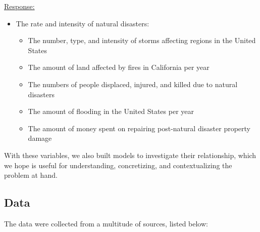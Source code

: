 \documentclass[10pt,]{article}
\begin{document}
\underline{Response:}

\begin{itemize}
  \item The rate and intensity of natural disasters:
  \begin{itemize}
    \item The number, type, and intensity of storms affecting regions in the United States
    \item The amount of land affected by fires in California per year
    \item The numbers of people displaced, injured, and killed due to natural disasters
    \item The amount of flooding in the United States per year
    \item The amount of money spent on repairing post-natural disaster property damage
  \end{itemize}
\end{itemize}

With these variables, we also built models to investigate their
relationship, which we hope is useful for understanding, concretizing,
and contextualizing the problem at hand.

\subsection{Data}\label{data}

The data were collected from a multitude of sources, listed below:
\end{document}
